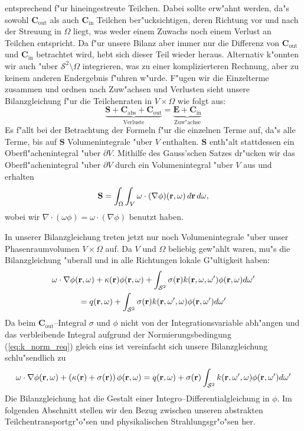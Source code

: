 	entsprechend f"ur hineingestreute Teilchen. Dabei sollte erw"ahnt werden, da"s sowohl $\mathbf{C}_\text{out}$ als auch $\mathbf{C}_\text{in}$ Teilchen ber"ucksichtigen, deren Richtung vor und nach der Streuung in $\Omega$ liegt, was weder einem Zuwachs noch einem Verlust an Teilchen entspricht. Da f"ur unsere Bilanz aber immer nur die Differenz von $\mathbf{C}_\text{out}$ und $\mathbf{C}_\text{in}$ betrachtet wird, hebt sich dieser Teil wieder heraus. Alternativ k"onnten wir auch "uber $\mathcal{S}^2 \setminus \Omega$ integrieren, was zu einer komplizierteren Rechnung, aber zu keinem anderen Endergebnis f"uhren w"urde. F"ugen wir die Einzelterme zusammen und ordnen nach Zuw"achsen und Verlusten sieht unsere Bilanzgleichung f"ur die Teilchenraten in $V \times \Omega$ wie folgt aus:
	$$\underbrace{\mathbf{S}+\mathbf{C}_\text{abs}+\mathbf{C}_\text{out}}_\text{Verluste}=\underbrace{\mathbf{E}+\mathbf{C}_\text{in}}_\text{Zuw"achse}$$
	Es f"allt bei der Betrachtung der Formeln f"ur die einzelnen Terme auf, da"s alle Terme, bis auf $\mathbf{S}$ Volumenintegrale "uber $V$ enthalten. $\mathbf{S}$ enth"alt stattdessen ein Oberfl"achenintegral "uber $\partial V$. Mithilfe des Gauss'schen Satzes dr"ucken wir das Oberfl"achenintegral "uber $\partial V$ durch ein Volumenintegral "uber $V$ aus und erhalten
	$$\mathbf{S}=\int_\Omega \int_V \omega \cdot (\nabla\phi)(\mathbf{r},\omega)\,d\mathbf{r}\,d\omega,$$
	wobei wir $\nabla \cdot(\omega\phi)=\omega\cdot(\nabla\phi)$ benutzt haben.
	
	In unserer Bilanzgleichung treten jetzt nur noch Volumenintegrale "uber unser Phasenraumvolumen $V \times \Omega$ auf. Da $V$ und $\Omega$ beliebig gew"ahlt waren, mu"s die Bilanzgleichung "uberall und in alle Richtungen lokale G"ultigkeit haben:
	\begin{multline*}
	  \omega\cdot\nabla\phi(\mathbf{r},\omega)+\kappa(\mathbf{r})\phi(\mathbf{r},\omega)+\int_{\mathcal{S}^2}\sigma(\mathbf{r})k(\mathbf{r},\omega,\omega')\phi(\mathbf{r},\omega)d\omega' \\
	  =q(\mathbf{r},\omega)+\int_{\mathcal{S}^2}\sigma(\mathbf{r})k(\mathbf{r},\omega',\omega)\phi(\mathbf{r},\omega')d\omega'
	\end{multline*}
	Da beim $\mathbf{C}_\text{out}$--Integral $\sigma$ und $\phi$ nicht von der Integrationsvariable abh"angen und das verbleibende Integral aufgrund der Normierungsbedingung (\ref{eq:k_norm_req}) gleich eins ist vereinfacht sich unsere Bilanzgleichung schlu"sendlich zu
	\begin{equation}\label{eq:particle_balance_equation}
	  \omega\cdot\nabla\phi(\mathbf{r},\omega)+\left(\kappa(\mathbf{r})+\sigma(\mathbf{r})\right)\phi(\mathbf{r},\omega)
	  =q(\mathbf{r},\omega)+\sigma(\mathbf{r})\int_{\mathcal{S}^2}k(\mathbf{r},\omega',\omega)\phi(\mathbf{r},\omega')d\omega'
	\end{equation}
	Die Bilanzgleichung hat die Gestalt einer Integro--Differentialgleichung in $\phi$.
	Im folgenden Abschnitt stellen wir den Bezug zwischen unseren abstrakten Teilchentransportgr"o"sen und physikalischen Strahlungsgr"o"sen her.

